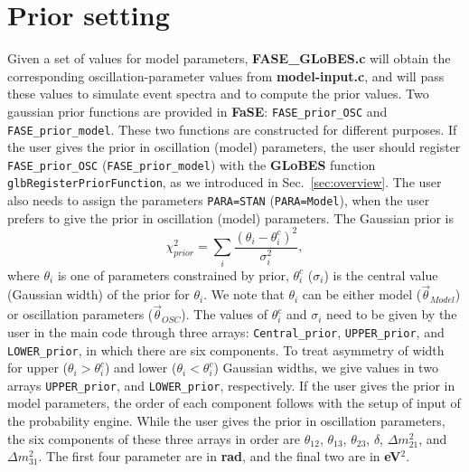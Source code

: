 \documentclass[aps,prd,nofootinbib,preprint]{revtex4}
\begin{document}
\section{Prior setting}\label{sec:prior}
Given a set of values for model parameters, \textbf{FASE\_GLoBES.c} will obtain the corresponding oscillation-parameter values from \textbf{model-input.c}, and will pass these values to simulate event spectra and to compute the prior values. Two gaussian prior functions are provided in \textbf{FaSE}: \texttt{FASE\_prior\_OSC} and \texttt{FASE\_prior\_model}. These two functions are constructed for different purposes. If the user gives the prior in oscillation (model) parameters, the user should register \texttt{FASE\_prior\_OSC} (\texttt{FASE\_prior\_model}) with the \textbf{GLoBES} function \texttt{glbRegisterPriorFunction}, as we introduced in Sec.~\ref{sec:overview}. The user also needs to assign the parameters \texttt{PARA=STAN} (\texttt{PARA=Model}), when the user prefers to give the prior in oscillation (model) parameters. The Gaussian prior is 
\begin{equation}\label{eq:prior}
\chi^2_{prior}=\sum_{i} \frac{(\theta_i-\theta^c_i)^2}{\sigma_i^2},
\end{equation}
 where $\theta_i$ is one of parameters constrained by prior, $\theta^c_i$ ($\sigma_i$) is the central value (Gaussian width) of the prior for $\theta_i$. We note that $\theta_i$ can be either model ($\vec{\theta}_{Model}$) or oscillation parameters ($\vec{\theta}_{OSC}$).
%
The values of $\theta^c_i$ and $\sigma_i$ need to be given by the user in the main code through three arrays: \texttt{Central\_prior}, \texttt{UPPER\_prior}, and \texttt{LOWER\_prior}, in which there are six components. To treat asymmetry of width for upper ($\theta_i>\theta_i^c$) and lower ($\theta_i<\theta_i^c$) Gaussian widths, we give values in two arrays \texttt{UPPER\_prior}, and \texttt{LOWER\_prior}, respectively. If the user gives the prior in model parameters, the order of each component follows with the setup of input of the probability engine. While the user gives the prior in oscillation parameters, the six components of these three arrays in order are $\theta_{12}$, $\theta_{13}$, $\theta_{23}$, $\delta$, $\Delta m_{21}^2$, and  $\Delta m_{31}^2$. The first four parameter are in \textbf{rad}, and the final two are in \textbf{eV$^2$}.
\end{document}
